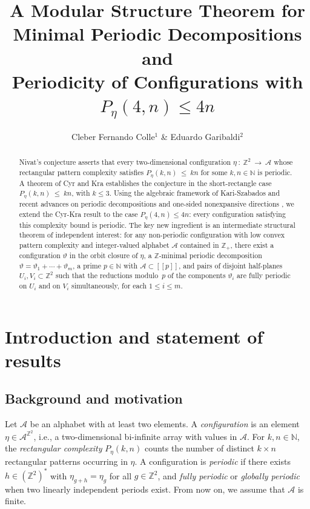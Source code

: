 \documentclass[12pt]{amsart}
\title[Periodicity from $P_\eta(4,n)\le 4n$]{A Modular Structure Theorem for \\ Minimal Periodic Decompositions and \\ Periodicity of Configurations with $P_\eta(4,n) \le 4n$}
\author[C. F. Colle \& E. Garibaldi]{Cleber Fernando Colle$^1$ \& Eduardo Garibaldi$^2$}
\numberwithin{equation}{section}
\newcommand{\llb}{[\![}
\newcommand{\rrb}{]\!]}
\begin{document}
\begin{abstract}
Nivat's conjecture asserts that every two-dimensional configuration
$\eta~\colon~\mathbb{Z}^2~\to~\mathcal{A}$ whose rectangular pattern complexity satisfies
$P_\eta(k,n)~\le~kn $ for some $k,n \in \mathbb{N}$ is periodic.
A theorem of Cyr and Kra \cite{CyrKra16} establishes the
conjecture in the short-rectangle case $P_\eta(k,n)~\le~kn$,  with $ k \le 3 $.
Using the algebraic framework of Kari-Szabados \cite{KariSzabados20}
and recent advances on periodic decompositions and one-sided
nonexpansive directions \cite{Colle23,Colle22}, we extend the
Cyr-Kra result to the case $P_\eta(4,n)\le 4n$: every configuration
satisfying this complexity bound is periodic. The key new ingredient is an intermediate structural theorem of
independent interest: for any non-periodic configuration with low
convex pattern complexity and integer-valued alphabet $ \mathcal{A} $ contained in
$\mathbb{Z}_+$, there exist a configuration $\vartheta$ in the orbit closure
of $\eta$, a $\mathbb{Z}$-minimal periodic decomposition
$\vartheta=\vartheta_1+\cdots+\vartheta_m$, a prime $p\in\mathbb{N}$ with
$\mathcal{A}\subset\llb p \rrb$, and pairs of disjoint half-planes
$U_i,V_i\subset\mathbb{Z}^2$ such that the reductions modulo~$p$ of the
components $\vartheta_i$ are fully periodic on $U_i$ and on $V_i$
simultaneously, for each $1\le i\le m$.
\end{abstract}

\maketitle 

\section{Introduction and statement of results}
\label{sec:intro}

\subsection{Background and motivation}
\label{subsec:background}

Let $\mathcal A$ be an alphabet with at least two elements.  A
\emph{configuration} is an element $\eta\in\mathcal A^{\mathbb Z^2}$, i.e., a
two-dimensional bi-infinite array with values in $\mathcal A$.  For
$k,n\in\mathbb N$, the \emph{rectangular complexity} $P_\eta(k,n)$ counts
the number of distinct $k \times n$ rectangular patterns occurring in
$\eta$. A configuration is \emph{periodic} if there exists
$h\in(\mathbb Z^2)^*$ with $\eta_{g+h}=\eta_g$ for all
$g\in\mathbb Z^2$, and \emph{fully periodic} or \emph{globally periodic} 
when two linearly independent periods exist. From now on, we assume that $\mathcal{A}$ is finite.
\end{document}
